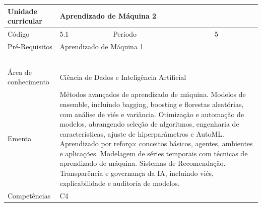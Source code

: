 \clearpage
\newpage

\begin{quadro}[ht!]
  \centering\scriptsize
\caption{Unidade Curricular Aprendizado de Máquina 2}

\begin{tabular}{|p{2.5cm}|p{2.5cm}|p{2.5cm}|p{2.5cm}|p{2.5cm}|}\hline

  Unidade curricular & \multicolumn{4}{p{10cm}|}{ Aprendizado de Máquina 2 }\\\hline
  Código & 5.1 & Período & \multicolumn{2}{p{5cm}|}{ 5 }\\\hline
  Pré-Requisitos & \multicolumn{4}{p{10cm}|}{ Aprendizado de Máquina 1 } \\\hline
  \cellcolor{blue1}{ CH PRESENCIAL } &
    \cellcolor{blue1}{CH EAD Síncrona} &
    \cellcolor{blue1}{CH EAD Síncrona Mediada} &
    \cellcolor{blue1}{CH EAD Assíncrona} &
    \cellcolor{blue1}{CH APCC} \\\hline
  \cellcolor{blue1}{ 60 } &
    \cellcolor{blue1}{ 0 } &
    \cellcolor{blue1}{ 0 } &
    \cellcolor{blue1}{ 30 } &
    \cellcolor{blue1}{0} \\\hline
  \cellcolor{blue1}{ CH Teórica } &
    \cellcolor{blue1}{CH Prática} &
    \cellcolor{blue1}{CH Humanidades} &
    \cellcolor{blue1}{CH Extensão} &
    \cellcolor{blue1}{CH EAD TOTAL} \\\hline
  \cellcolor{blue1}{ 30 } &
    \cellcolor{blue1}{ 30 } &
    \cellcolor{blue1}{ 0 } &
    \cellcolor{blue1}{ 0 } &
    \cellcolor{blue1}{ 30 } \\\hline
  \cellcolor{blue1}{CARGA-HORÁRIA TOTAL} & \multicolumn{4}{p{10cm}|}{ \cellcolor{blue1}{ 90 } } \\\hline
  Área de conhecimento & \multicolumn{4}{p{10cm}|}{ Ciência de Dados e Inteligência Artificial } \\\hline
  Ementa & \multicolumn{4}{p{10cm}|}{ Métodos avançados de aprendizado de máquina. Modelos de ensemble, incluindo bagging, boosting e florestas aleatórias, com análise de viés e variância. Otimização e automação de modelos, abrangendo seleção de algoritmos, engenharia de características, ajuste de hiperparâmetros e AutoML. Aprendizado por reforço: conceitos básicos, agentes, ambientes e aplicações. Modelagem de séries temporais com técnicas de aprendizado de máquina. Sistemas de Recomendação. Transparência e governança da IA, incluindo viés, explicabilidade e auditoria de modelos. } \\\hline
  Competências & \multicolumn{4}{p{10cm}|}{ C4 } \\\hline


  
	\end{tabular}

\end{quadro}


